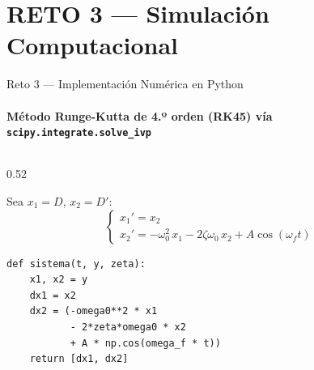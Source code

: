 \documentclass[10pt,aspectratio=169]{beamer}
\begin{document}
\section{RETO 3 — Simulación Computacional}

\begin{frame}{Reto 3 — Implementación Numérica en Python}
  \framesubtitle{Método Runge-Kutta de 4.º orden (RK45) vía \texttt{scipy.integrate.solve\_ivp}}

  \begin{columns}[T]
    \begin{column}{0.52\textwidth}
      \begin{tcolorbox}[modelbox={Reformulación como sistema de 1.er orden}]
        \small
        Sea $x_1 = D$,\; $x_2 = D'$:
        \[
          \begin{cases}
            x_1' = x_2 \\[4pt]
            x_2' = -\omega_0^2\,x_1
                   - 2\zeta\omega_0\,x_2
                   + A\cos(\omega_f t)
          \end{cases}
        \]
      \end{tcolorbox}
      \vspace{4pt}
      \small
      \begin{lstlisting}
def sistema(t, y, zeta):
    x1, x2 = y
    dx1 = x2
    dx2 = (-omega0**2 * x1
           - 2*zeta*omega0 * x2
           + A * np.cos(omega_f * t))
    return [dx1, dx2]


\end{lstlisting}
\end{column}
\end{columns}
\end{frame}
\end{document}
